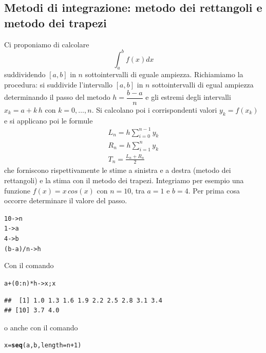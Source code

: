 \documentclass[onecolumn,11pt]{book}\usepackage[]{graphicx}\usepackage[]{color}
\makeatletter
\newcommand{\hlnum}[1]{\textcolor[rgb]{0.686,0.059,0.569}{#1}}%
\newcommand{\hlopt}[1]{\textcolor[rgb]{0,0,0}{#1}}%
\newcommand{\hlstd}[1]{\textcolor[rgb]{0.345,0.345,0.345}{#1}}%
\newcommand{\hlkwb}[1]{\textcolor[rgb]{0.69,0.353,0.396}{#1}}%
\newcommand{\hlkwc}[1]{\textcolor[rgb]{0.333,0.667,0.333}{#1}}%
\newcommand{\hlkwd}[1]{\textcolor[rgb]{0.737,0.353,0.396}{\textbf{#1}}}%
\newenvironment{kframe}{%
 \def\at@end@of@kframe{}%
 \ifinner\ifhmode%
  \def\at@end@of@kframe{\end{minipage}}%
  \begin{minipage}{\columnwidth}%
 \fi\fi%
 \def\FrameCommand##1{\hskip\@totalleftmargin \hskip-\fboxsep
 \colorbox{shadecolor}{##1}\hskip-\fboxsep
     \hskip-\linewidth \hskip-\@totalleftmargin \hskip\columnwidth}%
 \MakeFramed {\advance\hsize-\width
   \@totalleftmargin\z@ \linewidth\hsize
   \@setminipage}}%
 {\par\unskip\endMakeFramed%
 \at@end@of@kframe}
\newenvironment{knitrout}{}{} %
\makeatother
\begin{document}
\subsection{Metodi di integrazione: metodo dei rettangoli e metodo dei trapezi}
Ci proponiamo di calcolare $$\int_a^b f(x)dx$$ suddividendo $[a,b]$ in $n$ sottointervalli di eguale ampiezza. Richiamiamo la procedura:  si suddivide l'intervallo $[a,b]$ in $n$ sottointervalli di egual ampiezza determinando il passo del metodo
$h=\dfrac{b-a}{n}$
e gli estremi degli intervalli
$x_k=a+ k\, h$ con $k=0,\ldots,n$. Si calcolano poi i corrispondenti valori  $y_k=f(x_k)$ e si applicano poi le formule
\begin{eqnarray*}
L_n=h \sum_{i=0}^{n-1} y_k\\
R_n=h \sum_{i=1}^{n} y_k\\
T_n=\frac{L_n+R_n}{2}\end{eqnarray*}
che forniscono rispettivamente le stime a sinistra e a destra (metodo dei rettangoli) e la stima con il metodo dei trapezi.
Integriamo per esempio  una funzione $f(x)=x\, cos(x)$ con $n=10$, tra $a=1$ e $b=4$. Per prima cosa occorre determinare  il valore del passo.
\begin{knitrout}
\color{fgcolor}\begin{kframe}
\begin{alltt}
\hlnum{10}\hlkwb{->}\hlstd{n}
\hlnum{1}\hlkwb{->}\hlstd{a}
\hlnum{4}\hlkwb{->}\hlstd{b}
\hlstd{(b}\hlopt{-}\hlstd{a)}\hlopt{/}\hlstd{n}\hlkwb{->}\hlstd{h}
\end{alltt}
\end{kframe}
\end{knitrout}
Con il comando
\begin{knitrout}
\color{fgcolor}\begin{kframe}
\begin{alltt}
\hlstd{a}\hlopt{+}\hlstd{(}\hlnum{0}\hlopt{:}\hlstd{n)}\hlopt{*}\hlstd{h}\hlkwb{->}\hlstd{x;x}
\end{alltt}
\begin{verbatim}
##  [1] 1.0 1.3 1.6 1.9 2.2 2.5 2.8 3.1 3.4
## [10] 3.7 4.0
\end{verbatim}
\end{kframe}
\end{knitrout}
o anche con il comando
\begin{knitrout}
\color{fgcolor}\begin{kframe}
\begin{alltt}
\hlstd{x}\hlkwb{=}\hlkwd{seq}\hlstd{(a,b,}\hlkwc{length}\hlstd{=n}\hlopt{+}\hlnum{1}\hlstd{)}
\end{alltt}
\end{kframe}
\end{knitrout}
\end{document}
